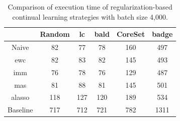 \begin{table}[h]
    \centering
    \begin{tabular}{c | c c c c c } 
         & Random & \gls{lc} & \gls{bald} & CoreSet & \gls{badge}\\ 
        \hline
        Naive & 82 & 77 & 78 & 160 & 497 \\
        \gls{ewc} & 82 & 83 & 82 & 145 & 493\\
        \gls{imm} & 76 & 78 & 76 & 129 & 487\\
        \gls{mas} & 81 & 88 & 81 & 145 & 501\\
        \gls{alasso} & 118 & 127 & 120 & 189 & 534\\
        \hline 
        Baseline & 717 & 712 & 721 & 782 & 1311 \\
    \end{tabular}
    \caption{Comparison of execution time of regularization-based continual learning strategies
    with batch size 4,000.}
    \label{fig:Evaluation:CAL:4000bTime}
\end{table}



